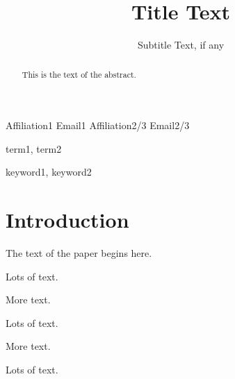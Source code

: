 \documentclass{sigplanconf}
\begin{document}
\setlength{\pdfpageheight}{\paperheight}
\setlength{\pdfpagewidth}{\paperwidth}






\title{Title Text}
\subtitle{Subtitle Text, if any}

           {Affiliation1}
           {Email1}
           {Affiliation2/3}
           {Email2/3}

\maketitle

\begin{abstract}
This is the text of the abstract.
\end{abstract}


\terms
term1, term2

\keywords
keyword1, keyword2

\section{Introduction}

The text of the paper begins here.

Lots of text.

More text.

Lots of text.

More text.


Lots of text.
\end{document}
